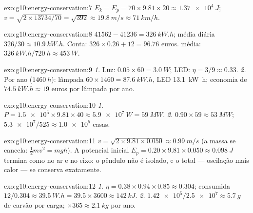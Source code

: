 \begin{solution}{exo:g10:energy-conservation:7}
$E_k = E_p = 70 \times 9.81 \times 20 \approx \qty{1.37e4}{J}$;
$v = \sqrt{2 \times 13734/70} = \sqrt{392} \approx \qty{19.8}{m/s}
\approx \qty{71}{km/h}$.
\end{solution}

\begin{solution}{exo:g10:energy-conservation:8}
$41562 - 41236 = \qty{326}{kW.h}$; média diária
$326/30 \approx \qty{10.9}{kW.h}$. Conta:
$326 \times 0.26 + 12 = 96.76$ euros.  média:
$\qty{326}{kW.h}/\qty{720}{h} \approx \qty{453}{W}$.
\end{solution}

\begin{solution}{exo:g10:energy-conservation:9}
\emph{1.} Luz: $0.05 \times 60 = \qty{3.0}{W}$; LED:
$\eta = 3/9 \approx 0.33$.
\emph{2.} Por ano ($\qty{1460}{h}$): lâmpada
$60 \times 1460 = \qty{87.6}{kW.h}$, LED \qty{13.1}{kW.h}; economia de
$\qty{74.5}{kW.h} \approx 19$ euros por lâmpada por ano.
\end{solution}

\begin{solution}{exo:g10:energy-conservation:10}
\emph{1.} $P = \num{1.5e5} \times 9.81 \times 40 \approx
\qty{5.9e7}{W} = \qty{59}{MW}$.
\emph{2.} $0.90 \times 59 \approx \qty{53}{MW}$;
$\num{5.3e7}/525 \approx \num{1.0e5}$ casas.
\end{solution}

\begin{solution}{exo:g10:energy-conservation:11}
$v = \sqrt{2 \times 9.81 \times 0.050} \approx \qty{0.99}{m/s}$ (a massa
se cancela: $\tfrac12 m v^2 = mgh$). A  potencial inicial
$E_p = 0.20 \times 9.81 \times 0.050 \approx \qty{0.098}{J}$ termina como
 no ar e no eixo: o pêndulo não é isolado, e o total ---
oscilação mais calor --- se conserva exatamente.
\end{solution}

\begin{solution}{exo:g10:energy-conservation:12}
\emph{1.} $\eta = 0.38 \times 0.94 \times 0.85 \approx 0.304$; consumida
$12/0.304 \approx \qty{39.5}{W.h} = 39.5 \times 3600 \approx
\qty{142}{kJ}$.
\emph{2.} $\num{1.42e5}/\num{2.5e7} \approx \qty{5.7}{g}$ de carvão por
carga; $\times 365 \approx \qty{2.1}{kg}$ por ano.
\end{solution}


